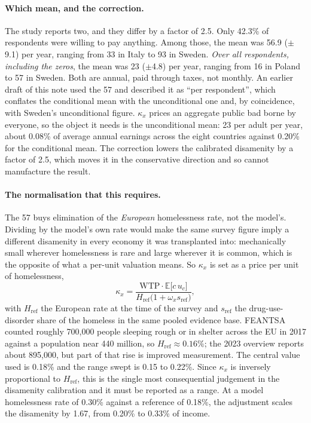 \documentclass[11pt]{article}
\begin{document}
\paragraph{Which mean, and the correction.} The study reports two, and they
differ by a factor of 2.5. Only 42.3\% of respondents were willing to pay
anything. Among those, the mean was \EUR{}56.9 ($\pm$9.1) per year, ranging from
\EUR{}33 in Italy to \EUR{}93 in Sweden. \emph{Over all respondents, including
the zeros}, the mean was \EUR{}23 ($\pm$4.8) per year, ranging from \EUR{}16 in
Poland to \EUR{}57 in Sweden. Both are annual, paid through taxes, not monthly.
An earlier draft of this note used the \EUR{}57 and described it as ``per
respondent'', which conflates the conditional mean with the unconditional one
and, by coincidence, with Sweden's unconditional figure. $\kappa_x$ prices an
aggregate public bad borne by everyone, so the object it needs is the
unconditional mean: \EUR{}23 per adult per year, about 0.08\% of average annual
earnings across the eight countries against 0.20\% for the conditional mean. The
correction lowers the calibrated disamenity by a factor of 2.5, which moves it in
the conservative direction and so cannot manufacture the result.

\paragraph{The normalisation that this requires.} The \EUR{}57 buys elimination
of the \emph{European} homelessness rate, not the model's. Dividing by the
model's own rate would make the same survey figure imply a different disamenity
in every economy it was transplanted into: mechanically small wherever
homelessness is rare and large wherever it is common, which is the opposite of
what a per-unit valuation means. So $\kappa_x$ is set as a price per unit of
homelessness,
\begin{equation}
\kappa_x=\frac{\text{WTP}\cdot\mathbb E\bigl[c\,u_c\bigr]}
{H_{\text{ref}}\bigl(1+\omega_x s_{\text{ref}}\bigr)},
\end{equation}
with $H_{\text{ref}}$ the European rate at the time of the survey and
$s_{\text{ref}}$ the drug-use-disorder share of the homeless in the same pooled
evidence base. FEANTSA counted roughly 700,000 people sleeping rough or in
shelter across the EU in 2017 against a population near 440 million, so
$H_{\text{ref}}\approx0.16\%$; the 2023 overview reports about 895,000, but part
of that rise is improved measurement. The central value used is 0.18\% and the
range swept is 0.15 to 0.22\%. Since $\kappa_x$ is inversely proportional to
$H_{\text{ref}}$, this is the single most consequential judgement in the
disamenity calibration and it must be reported as a range. At a model
homelessness rate of 0.30\% against a reference of 0.18\%, the adjustment scales
the disamenity by 1.67, from 0.20\% to 0.33\% of income.
\end{document}
